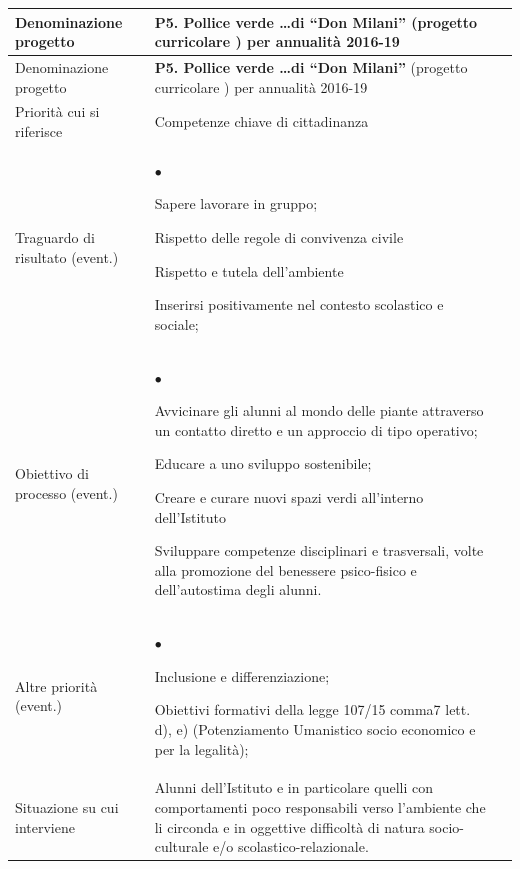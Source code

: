 \documentclass[12pt,a4paper,oneside]{memoir}
\newenvironment{elenco}{\begin{list}{$\bullet$}{%
              \setlength{\leftmargin}{4mm}%
              \setlength{\rightmargin}{1mm}%
               \setlength{\itemindent}{0mm}%
               \setlength{\labelwidth}{2mm}%
               \setlength{\labelsep}{2mm}%
              \setlength{\itemsep}{-\parsep}%
              \setlength{\partopsep}{0pt}%
              \setlength{\topsep}{0pt}%
             \setlength{\parskip}{0pt}%
              }}{\end{list}}
\begin{document}
\begin{footnotesize}
\begin{longtable}{|>{\raggedright}p{2.5cm}|>{\raggedright\arraybackslash}P{10cm}|}
\hline
{}
\label{P5}Denominazione progetto&\textbf{P5. Pollice verde \ldots di ``Don Milani''} (progetto curricolare ) per annualità 2016-19\\ \hline \endfirsthead
\hline
{}
Denominazione progetto&\textbf{P5. Pollice verde \ldots di ``Don Milani''} (progetto curricolare ) per annualità 2016-19\\ \hline \endhead
{}
\endfoot
\hline
\endlastfoot
Priorità cui si riferisce&Competenze chiave di cittadinanza \\ \hline
Traguardo di risultato (event.)&
\begin{elenco}
\item Sapere lavorare in gruppo; 
\item Rispetto delle regole di convivenza civile
\item Rispetto e tutela dell'ambiente 
\item Inserirsi positivamente nel contesto scolastico e sociale;
\end{elenco}\\[-4mm] \hline
Obiettivo di processo (event.)&
\begin{elenco}
\item Avvicinare gli alunni al mondo delle piante attraverso un contatto diretto e un approccio di tipo operativo;
\item Educare a uno sviluppo sostenibile;
\item Creare e curare nuovi spazi verdi all'interno dell'Istituto
\item Sviluppare competenze disciplinari e trasversali, volte alla promozione del benessere psico-fisico e dell'autostima degli alunni.
\end{elenco}\\[-4mm] \hline
Altre priorità (event.)&
\begin{elenco}
\item Inclusione e differenziazione;
\item Obiettivi formativi della legge 107/15 comma7 lett. d), e) (Potenziamento Umanistico socio economico e per la legalità);
\end{elenco}\\[-4mm] \hline
Situazione su cui interviene&Alunni dell'Istituto e in particolare quelli con comportamenti poco responsabili verso l'ambiente che li circonda e in oggettive difficoltà di natura socio-culturale e/o scolastico-relazionale.\\ \hline

\end{longtable}
\end{footnotesize}
\end{document}
